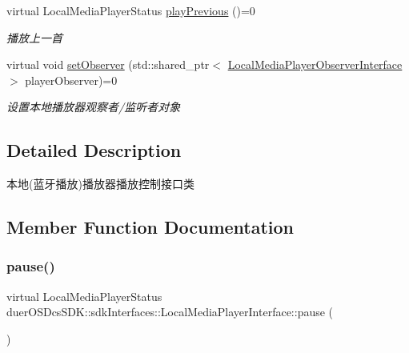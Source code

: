 \begin{DoxyCompactItemize}
virtual Local\+Media\+Player\+Status \hyperlink{classduerOSDcsSDK_1_1sdkInterfaces_1_1LocalMediaPlayerInterface_a15217d174ee9c7a6d278823aa1ef8d01}{play\+Previous} ()=0
\begin{DoxyCompactList}\small\item\em 播放上一首 \end{DoxyCompactList}\item 
virtual void \hyperlink{classduerOSDcsSDK_1_1sdkInterfaces_1_1LocalMediaPlayerInterface_aaf5ec74c15c0f2910d390e38b502ddec}{set\+Observer} (std\+::shared\+\_\+ptr$<$ \hyperlink{classduerOSDcsSDK_1_1sdkInterfaces_1_1LocalMediaPlayerObserverInterface}{Local\+Media\+Player\+Observer\+Interface} $>$ player\+Observer)=0
\begin{DoxyCompactList}\small\item\em 设置本地播放器观察者/监听者对象 \end{DoxyCompactList}\end{DoxyCompactItemize}


\subsection{Detailed Description}
本地(蓝牙播放)播放器播放控制接口类 

\subsection{Member Function Documentation}
\mbox{\label{classduerOSDcsSDK_1_1sdkInterfaces_1_1LocalMediaPlayerInterface_ac134ae6ae0862f930c7eb728ae58706a}} 
\subsubsection{\texorpdfstring{pause()}{pause()}}
{\footnotesize\ttfamily virtual Local\+Media\+Player\+Status duer\+O\+S\+Dcs\+S\+D\+K\+::sdk\+Interfaces\+::\+Local\+Media\+Player\+Interface\+::pause (\begin{DoxyParamCaption}{ }\end{DoxyParamCaption})\hspace{0.3cm}{\ttfamily [pure virtual]}}



